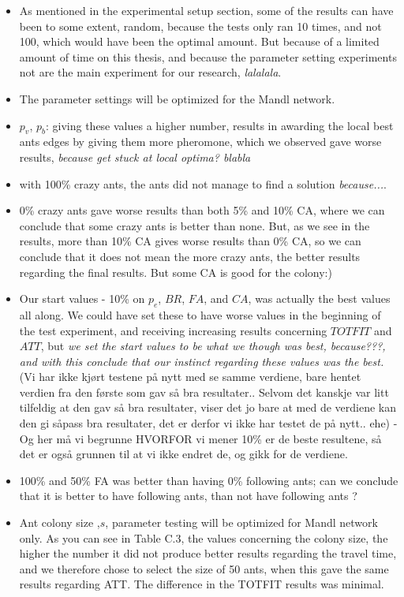 \begin{itemize}
\item As mentioned in the experimental setup section, some of the results can have been to some extent, random, because the tests only ran 10 times, and not 100, which would have been the optimal amount. But because of a limited amount of time on this thesis, and because the parameter setting experiments not are the main experiment for our research, \emph{\color{blue} lalalala}. 
\item The parameter settings will be optimized for the Mandl network.
\item $p_v$, $p_b$: giving these values a higher number, results in awarding the local best ants edges by giving them more pheromone, which we observed gave worse results, \emph{\color{blue}because get stuck at local optima? blabla}
\item with 100\% crazy ants, the ants did not manage to find a solution \emph{\color{blue}because...}. 
\item 0\% crazy ants gave worse results than both 5\% and 10\% CA, where we can conclude that some crazy ants is better than none. But, as we see in the results, more than 10\% CA gives worse results than 0\% CA, so we can conclude that it does not mean the more crazy ants, the better results regarding the final results. But some CA is good for the colony:)
\item Our start values - 10\% on $p_e$, $BR$, $FA$, and $CA$, was actually the best values all along. We could have set these to have worse values in the beginning of the test experiment, and receiving increasing results concerning $TOTFIT$ and $ATT$, but \emph{\color{blue} we set the start values to be what we though was best, because???, and with this conclude that our instinct regarding these values was the best.} (Vi har ikke kjørt testene på nytt med se samme verdiene, bare hentet verdien fra den første som gav så bra resultater.. Selvom det kanskje var litt tilfeldig at den gav så bra resultater, viser det jo bare at med de verdiene kan den gi såpass bra resultater, det er derfor vi ikke har testet de på nytt.. ehe) - Og her må vi begrunne HVORFOR vi mener 10\% er de beste resultene, så det er også grunnen til at vi ikke endret de, og gikk for de verdiene.
\item 100\% and 50\% FA was better than having 0\% following ants; can we conclude that it is better to have following ants, than not have following ants ?
\item Ant colony size ,$s$, parameter testing will be optimized for Mandl network only. As you can see in Table C.3, the values concerning the colony size, the higher the number it did not produce better results regarding the travel time, and we therefore chose to select the size of 50 ants, when this gave the same results regarding ATT. The difference in the TOTFIT results was minimal.
\end{itemize}

